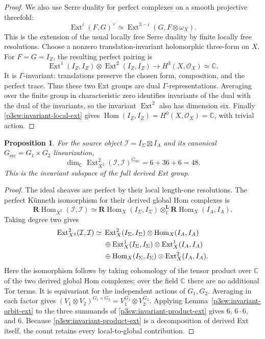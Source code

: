 \documentclass[11pt]{article}
\newtheorem{proposition}[theorem]{Proposition}
\numberwithin{equation}{section}
\begin{document}
\begin{proof}
We also use Serre duality for perfect complexes on a smooth projective
threefold:
\[
 \operatorname{Ext}^i(F,G)^\vee
 \simeq\operatorname{Ext}^{3-i}(G,F\otimes\omega_X).
\]
This is the extension of the usual locally free Serre duality
\cite{p3swSerreDuality} by finite locally free resolutions.  Choose a
nonzero translation-invariant holomorphic three-form on \(X\).  For
\(F=G=I_Z\), the resulting perfect pairing is
\[
 \operatorname{Ext}^1(I_Z,I_Z)\otimes
 \operatorname{Ext}^2(I_Z,I_Z)
 \longrightarrow H^3(X,\mathcal O_X)\simeq\mathbb C.
\]
It is \(\Gamma\)-invariant: translations preserve the chosen form,
composition, and the perfect trace.  Thus these two Ext groups are dual
\(\Gamma\)-representations.  Averaging over the finite group in
characteristic zero identifies invariants of the dual with the dual of
the invariants, so the invariant \(\operatorname{Ext}^2\) also has
dimension six.  Finally \eqref{p3sw:invariant-local-ext} gives
\(\operatorname{Hom}(I_Z,I_Z)=H^0(X,\mathcal O_X)=\mathbb C\), with
trivial action.
\end{proof}

\begin{proposition}\label{p3sw:invariant-ext}
For the source object \(\mathcal I=I_\Sigma\boxtimes I_A\) and its
canonical \(G_{\mathrm{src}}=G_1\times G_2\) linearization,
\[
 \dim_{\mathbb C}
 \operatorname{Ext}^2_{X^2}(\mathcal I,\mathcal I)^{G_{\mathrm{src}}}
 =6+36+6=48.
\]
This is the invariant subspace of the full derived Ext group.
\end{proposition}

\begin{proof}
The ideal sheaves are perfect by their local length-one resolutions.
The perfect K\"unneth isomorphism for their derived global Hom complexes
is
\[
 \mathbf R\operatorname{Hom}_{X^2}(\mathcal I,\mathcal I)
 \simeq
 \mathbf R\operatorname{Hom}_X(I_\Sigma,I_\Sigma)
 \otimes_{\mathbb C}^{\mathbf L}
 \mathbf R\operatorname{Hom}_X(I_A,I_A).
\]
Taking degree two gives
\begin{align}
 \operatorname{Ext}^2_{X^2}(\mathcal I,\mathcal I)
 \simeq{}&
 \operatorname{Ext}^2_X(I_\Sigma,I_\Sigma)
       \otimes\operatorname{Hom}_X(I_A,I_A) \notag\\
 &\oplus\operatorname{Ext}^1_X(I_\Sigma,I_\Sigma)
       \otimes\operatorname{Ext}^1_X(I_A,I_A) \notag\\
 &\oplus\operatorname{Hom}_X(I_\Sigma,I_\Sigma)
       \otimes\operatorname{Ext}^2_X(I_A,I_A).
 \label{p3sw:invariant-product-ext}
\end{align}
Here the isomorphism follows by taking cohomology of the tensor product
over \(\mathbb C\) of the two derived global Hom complexes; over the
field \(\mathbb C\) there are no additional Tor terms.  It is equivariant
for the independent actions of \(G_1,G_2\).  Averaging in each factor
gives \((V_1\otimes V_2)^{G_1\times G_2}
=V_1^{G_1}\otimes V_2^{G_2}\).  Applying
Lemma~\ref{p3sw:invariant-orbit-ext} to the three summands of
\eqref{p3sw:invariant-product-ext} gives \(6\), \(6\cdot6\), and \(6\).
Because \eqref{p3sw:invariant-product-ext} is a decomposition of derived
Ext itself, the count retains every local-to-global contribution.
\end{proof}
\end{document}
